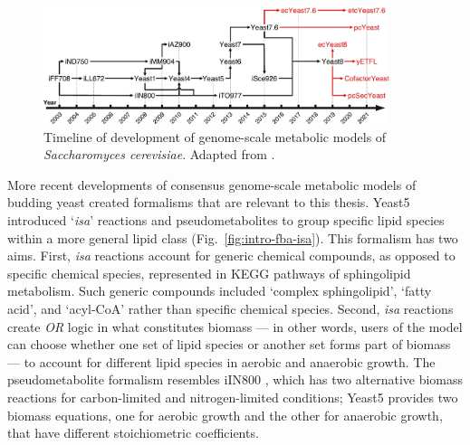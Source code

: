 \begin{figure}
  \centering
  \includegraphics[width=0.9\textwidth]{chenGenomescaleModelingYeast2022_1}
  \caption[
    Timeline of development of genome-scale metabolic models of \textit{Saccharomyces cerevisiae}.
  ]{
    Timeline of development of genome-scale metabolic models of \textit{Saccharomyces cerevisiae}.
    Adapted from \textcite{chenGenomescaleModelingYeast2022}.
    }
  \label{fig:intro-fba-timeline}
\end{figure}

More recent developments of consensus genome-scale metabolic models of budding yeast created formalisms that are relevant to this thesis.
Yeast5 \parencite{heavnerYeastExpandedReconstruction2012} introduced `\textit{isa}' reactions and pseudometabolites to group specific lipid species within a more general lipid class (Fig.\ \ref{fig:intro-fba-isa}).
This formalism has two aims.
First, \textit{isa} reactions account for generic chemical compounds, as opposed to specific chemical species, represented in KEGG pathways of sphingolipid metabolism.
Such generic compounds included `complex sphingolipid', `fatty acid', and `acyl-CoA' rather than specific chemical species.
Second, \textit{isa} reactions create \textit{OR} logic in what constitutes biomass --- in other words, users of the model can choose whether one set of lipid species or another set forms part of biomass --- to account for different lipid species in aerobic and anaerobic growth.
The pseudometabolite formalism resembles iIN800 \parencite{nookaewGenomescaleMetabolicModel2008}, which has two alternative biomass reactions for carbon-limited and nitrogen-limited conditions; Yeast5 provides two biomass equations, one for aerobic growth and the other for anaerobic growth, that have different stoichiometric coefficients.

